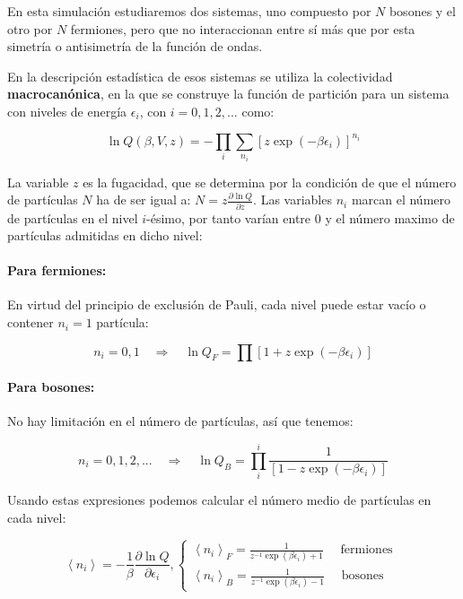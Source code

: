 \documentclass[11pt, a4paper]{article} %
\theoremstyle{named}
\begin{document}
En esta simulación estudiaremos dos sistemas, uno compuesto por $N$ bosones y el otro por $N$ fermiones, pero que no interaccionan entre sí más que por esta simetría o antisimetría de la función de ondas.

En la descripción estadística de esos sistemas se utiliza la colectividad \textbf{macrocanónica}, en la que se construye la función de partición para un sistema con niveles de energía $\epsilon_i$, con $i=0,1,2,...$ como:

$$
\ln Q(\beta,V,z) = -\prod_i \sum_{n_i}[z \exp (-\beta \epsilon_i)]^{n_i}
$$

La variable $z$ es la fugacidad, que se determina por la condición de que el número de partículas $N$ ha de ser igual a: $N=z \frac{\partial \ln Q}{\partial z}$. Las variables $n_i$ marcan el número de partículas en el nivel $i$-ésimo, por tanto varían entre $0$ y el número maximo de partículas admitidas en dicho nivel:

\paragraph{Para fermiones:} En virtud del principio de exclusión de Pauli, cada nivel puede estar vacío o contener $n_i = 1$ partícula:

$$
n_{i}=0,1 \quad \Longrightarrow \quad \ln Q_{F} = \prod\left[1+z \exp \left(-\beta \epsilon_{i}\right)\right]
$$

\paragraph{Para bosones:} No hay limitación en el número de partículas, así que tenemos:

$$
n_{i}=0,1,2, ... \quad \Longrightarrow \quad \ln Q_{B} =\prod_{i}^{i} \frac{1}{\left[1-z \exp \left(-\beta \epsilon_{i}\right)\right]}
$$

Usando estas expresiones podemos calcular el número medio de partículas en cada nivel:

\begin{equation}
\left\langle n_{i}\right\rangle=-\frac{1}{\beta} \frac{\partial \ln Q}{\partial \epsilon_{i}},
\left\{\begin{array}{l}{\left\langle n_{i}\right\rangle_{F}=\frac{1}{z^{-1} \exp \left(\beta \epsilon_{i}\right)+1} \quad \text { fermiones }} \\ {\left\langle n_{i}\right\rangle_{B}=\frac{1}{z^{-1} \exp \left(\beta \epsilon_{i}\right)-1} \quad \text { bosones }}\end{array}\right.
\end{equation}
\end{document}
